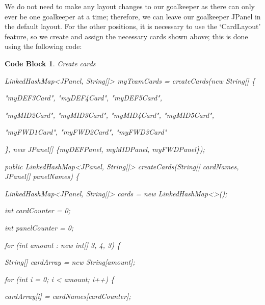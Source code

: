 \documentclass[12pt, a4paper, oneside]{book}
\newtheorem{codeblock}[theorem]{Code Block}
\numberwithin{equation}{section}
\begin{document}
We do not need to make any layout changes to our goalkeeper as there can only ever be one goalkeeper at a time; therefore, we can leave our goalkeeper JPanel in the default layout. For the other positions, it is necessary to use the `CardLayout' feature, so we create and assign the necessary cards shown above; this is done using the following code:

\begin{codeblock} \label{Create cards}
  Create cards

  LinkedHashMap<JPanel, String[]> myTeamCards = createCards(new String[] \{
  
  \hspace{\parindent}"myDEF3Card", "myDEF4Card", "myDEF5Card",
  
  \hspace{\parindent}"myMID2Card", "myMID3Card", "myMID4Card", "myMID5Card",
  
  \hspace{\parindent}"myFWD1Card", "myFWD2Card", "myFWD3Card"

\}, new JPanel[] \{myDEFPanel, myMIDPanel, myFWDPanel\});

\vspace{0.5cm}

  public LinkedHashMap<JPanel, String[]> createCards(String[] cardNames, JPanel[] panelNames) \{

  \hspace{\parindent}LinkedHashMap<JPanel, String[]> cards = new LinkedHashMap<>();

  \hspace{\parindent}int cardCounter = 0;

  \hspace{\parindent}int panelCounter = 0;
        
  \hspace{\parindent}for (int amount : new int[] {3, 4, 3}) \{
            
  \hspace{\parindent}\hspace{\parindent}String[] cardArray = new String[amount];
            
  \hspace{\parindent}\hspace{\parindent}for (int i = 0; i < amount; i++) \{
                
  \hspace{\parindent}\hspace{\parindent}\hspace{\parindent}cardArray[i] = cardNames[cardCounter];
                

\end{codeblock}
\end{document}
